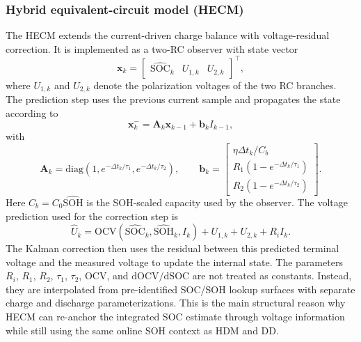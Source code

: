 \documentclass[
    a4paper,
    12pt,
    titlepage,
    bibliography=totoc,
    twoside=on,
    parskip=false,
    numbers=noenddot,
    cleardoublepage=empty,
    DIV=12,
    BCOR=12.0mm,
    headheight=36pt,
    headings=openright
]{scrreprt}
\begin{document}
\subsubsection{Hybrid equivalent-circuit model (HECM)}
The HECM extends the current-driven charge balance with voltage-residual correction. It is implemented as a two-RC observer with state vector
\begin{equation}
    \mathbf{x}_k=
    \begin{bmatrix}
        \widehat{\mathrm{SOC}}_k & U_{1,k} & U_{2,k}
    \end{bmatrix}^{\top},
    \label{eq:robustness_hecm_state}
\end{equation}
where $U_{1,k}$ and $U_{2,k}$ denote the polarization voltages of the two RC branches. The prediction step uses the previous current sample and propagates the state according to
\begin{equation}
    \mathbf{x}_{k}^{-}=\mathbf{A}_k\mathbf{x}_{k-1}+\mathbf{b}_kI_{k-1},
    \label{eq:robustness_hecm_prediction}
\end{equation}
with
\begin{equation}
    \mathbf{A}_k=
    \mathrm{diag}\!\left(1,e^{-\Delta t_k/\tau_1},e^{-\Delta t_k/\tau_2}\right),
    \qquad
    \mathbf{b}_k=
    \begin{bmatrix}
        \eta\Delta t_k/C_b\\
        R_1\!\left(1-e^{-\Delta t_k/\tau_1}\right)\\
        R_2\!\left(1-e^{-\Delta t_k/\tau_2}\right)
    \end{bmatrix}.
    \label{eq:robustness_hecm_ab}
\end{equation}
Here $C_b=C_0\widehat{\mathrm{SOH}}$ is the SOH-scaled capacity used by the observer. The voltage prediction used for the correction step is
\begin{equation}
    \widehat{U}_k
    =
    \mathrm{OCV}\!\left(\widehat{\mathrm{SOC}}_k,\widehat{\mathrm{SOH}}_k,I_k\right)
    +U_{1,k}+U_{2,k}+R_iI_k .
    \label{eq:robustness_hecm_voltage}
\end{equation}
The Kalman correction then uses the residual between this predicted terminal voltage and the measured voltage to update the internal state. The parameters $R_i$, $R_1$, $R_2$, $\tau_1$, $\tau_2$, $\mathrm{OCV}$, and $\mathrm{dOCV}/\mathrm{dSOC}$ are not treated as constants. Instead, they are interpolated from pre-identified SOC/SOH lookup surfaces with separate charge and discharge parameterizations. This is the main structural reason why HECM can re-anchor the integrated SOC estimate through voltage information while still using the same online SOH context as HDM and DD.
\end{document}
